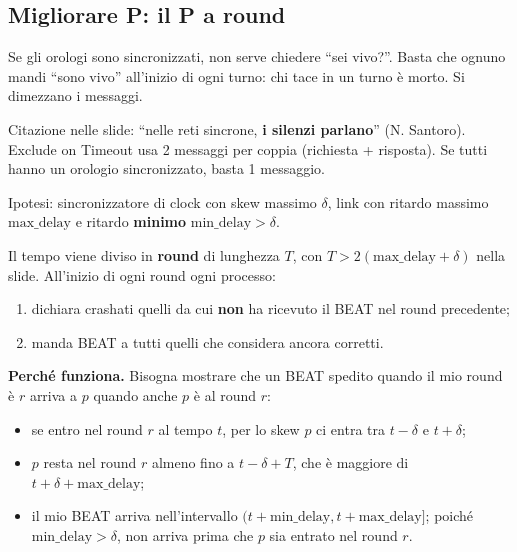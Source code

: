 \subsection{Migliorare P: il P a round}

\begin{inbreve}

Se gli orologi sono sincronizzati, non serve chiedere ``sei vivo?''. Basta che ognuno mandi ``sono vivo'' all'inizio di ogni turno: chi tace in un turno è morto. Si dimezzano i messaggi.

\end{inbreve}

Citazione nelle slide: ``nelle reti sincrone, \textbf{i silenzi parlano}'' (N. Santoro). Exclude on Timeout usa 2 messaggi per coppia (richiesta + risposta). Se tutti hanno un orologio sincronizzato, basta 1 messaggio.

Ipotesi: sincronizzatore di clock con skew massimo \(\delta\), link con ritardo massimo \(\text{max\_delay}\) e ritardo \textbf{minimo} \(\text{min\_delay} > \delta\).

Il tempo viene diviso in \textbf{round} di lunghezza \(T\), con \(T > 2(\text{max\_delay} + \delta)\) nella slide. All'inizio di ogni round ogni processo:

\begin{enumerate}
\def\labelenumi{\arabic{enumi}.}
\tightlist
\item
  dichiara crashati quelli da cui \textbf{non} ha ricevuto il BEAT nel round precedente;
\item
  manda BEAT a tutti quelli che considera ancora corretti.
\end{enumerate}

\textbf{Perché funziona.} Bisogna mostrare che un BEAT spedito quando il mio round è \(r\) arriva a \(p\) quando anche \(p\) è al round \(r\):

\begin{itemize}
\tightlist
\item
  se entro nel round \(r\) al tempo \(t\), per lo skew \(p\) ci entra tra \(t - \delta\) e \(t + \delta\);
\item
  \(p\) resta nel round \(r\) almeno fino a \(t - \delta + T\), che è maggiore di \(t + \delta + \text{max\_delay}\);
\item
  il mio BEAT arriva nell'intervallo \((t + \text{min\_delay}, t + \text{max\_delay}]\); poiché \(\text{min\_delay} > \delta\), non arriva prima che \(p\) sia entrato nel round \(r\).
\end{itemize}


